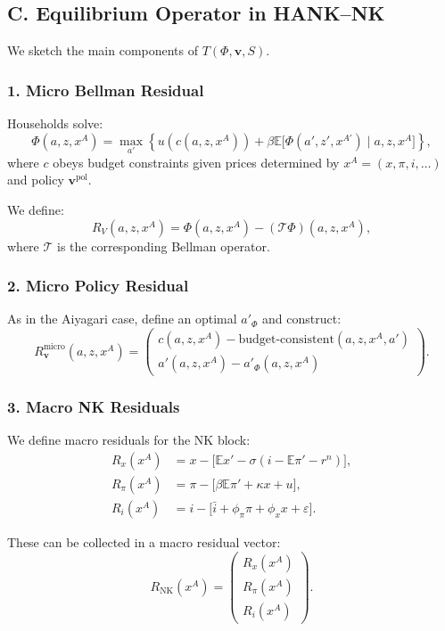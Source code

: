 \documentclass[12pt]{article}
\begin{document}
\subsection*{C. Equilibrium Operator in HANK--NK}

We sketch the main components of $T(\Phi,\mathbf{v},S)$.

\subsubsection*{1. Micro Bellman Residual}

Households solve:
\[
\Phi(a,z,x^A)
=
\max_{a'}
\left\{
    u(c(a,z,x^A))
    + \beta \mathbb{E}
    \big[
        \Phi(a',z',x^{A\prime})
    \mid a,z,x^A
    \big]
\right\},
\]
where $c$ obeys budget constraints given prices determined by
$x^A=(x,\pi,i,\dots)$ and policy $\mathbf{v}^{\text{pol}}$.

We define:
\[
R_V(a,z,x^A)
=
\Phi(a,z,x^A) - (\mathcal{T}\Phi)(a,z,x^A),
\]
where $\mathcal{T}$ is the corresponding Bellman operator.

\subsubsection*{2. Micro Policy Residual}

As in the Aiyagari case, define an optimal $a'_\Phi$ and construct:
\[
R_{\mathbf{v}}^{\text{micro}}(a,z,x^A)
=
\begin{pmatrix}
c(a,z,x^A) - \text{budget-consistent}(a,z,x^A,a') \\
a'(a,z,x^A) - a'_\Phi(a,z,x^A)
\end{pmatrix}.
\]

\subsubsection*{3. Macro NK Residuals}

We define macro residuals for the NK block:
\begin{align}
R_x(x^A)
&=
x - \big[
    \mathbb{E}x' - \sigma (i - \mathbb{E}\pi' - r^n)
\big],\\
R_\pi(x^A)
&=
\pi - \big[
    \beta \mathbb{E}\pi' + \kappa x + u
\big],\\
R_i(x^A)
&=
i - \big[\bar{i} + \phi_\pi\pi + \phi_x x + \varepsilon\big].
\end{align}

These can be collected in a macro residual vector:
\[
R_{\text{NK}}(x^A)
=
\begin{pmatrix}
R_x(x^A) \\
R_\pi(x^A) \\
R_i(x^A)
\end{pmatrix}.
\]
\end{document}
